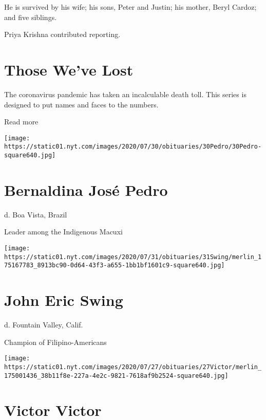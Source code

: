 He is survived by his wife; his sons, Peter and Justin; his mother,
Beryl Cardoz; and five siblings.

Priya Krishna contributed reporting.

\href{https://www.nytimes.com/interactive/2020/obituaries/people-died-coronavirus-obituaries.html?action=click\&pgtype=Article\&state=default\&region=BELOW_MAIN_CONTENT\&context=covid_obits_promo}{}

\hypertarget{those-weve-lost}{%
\section{Those We've Lost}\label{those-weve-lost}}

The coronavirus pandemic has taken an incalculable death toll. This
series is designed to put names and faces to the numbers.

Read more

\texttt{[image: https://static01.nyt.com/images/2020/07/30/obituaries/30Pedro/30Pedro-square640.jpg]}

\hypertarget{bernaldina-josuxe9-pedro}{%
\section{Bernaldina José Pedro}\label{bernaldina-josuxe9-pedro}}

d. Boa Vista, Brazil

Leader among the Indigenous Macuxi

\texttt{[image: https://static01.nyt.com/images/2020/07/31/obituaries/31Swing/merlin\_175167783\_8913bc90-0d64-43f3-a655-1bb1bf1601c9-square640.jpg]}

\hypertarget{john-eric-swing}{%
\section{John Eric Swing}\label{john-eric-swing}}

d. Fountain Valley, Calif.

Champion of Filipino-Americans

\texttt{[image: https://static01.nyt.com/images/2020/07/27/obituaries/27Victor/merlin\_175001436\_38b11f8e-227a-4e2c-9821-7618af9b2524-square640.jpg]}

\hypertarget{victor-victor}{%
\section{Victor Victor}\label{victor-victor}}

